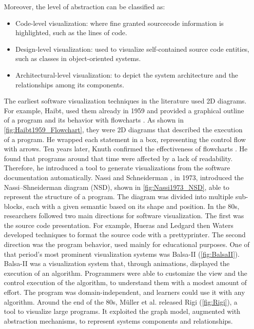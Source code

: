 Moreover, the level of abstraction can be classified as:
\begin{itemize}
	\item Code-level visualization: where fine granted sourcecode information is highlighted, such as the lines of code. 
	\item Design-level visualization: used to visualize self-contained source code entities, such as classes in object-oriented systems. 
	\item Architectural-level visualization: to depict the system architecture and the relationships among its components. 
\end{itemize}



The earliest software visualization techniques in the literature used 2D diagrams. 
For example, Haibt, used them already in 1959 and provided a graphical outline of a program and its behavior with flowcharts \cite{Haibt1959}. 
As shown in \autoref{fig:Haibt1959_Flowchart}, they were 2D diagrams that described the execution of a program.
He wrapped each statement in a box, representing the control flow with arrows.
Ten years later, Knuth confirmed the effectiveness of flowcharts \cite{Knuth1963}. 
He found that programs around that time were affected by a lack of readability.
Therefore, he introduced a tool to generate visualizations from the software documentation automatically.
Nassi and Schneiderman \cite{Nassi1973}, in 1973, introduced the Nassi–Shneiderman diagram (NSD), shown in \autoref{fig:Nassi1973_NSD},  able to represent the structure of a program. 
The diagram was divided into multiple sub-blocks, each with a given semantic based on its shape and position. 
In the 80s, researchers followed two main directions for software visualization. The first was the source code presentation.
For example, Hueras and Ledgard \cite{Hueras1977} then Waters \cite{Waters1983} developed techniques to format the source code with a prettyprinter. 
The second direction was the program behavior, used mainly for educational purposes.
One of that period's most prominent visualization systems was Balsa-II \cite{Brown1988} (\autoref{fig:BalsaII}).
Balsa-II was a visualization system that, through animations, displayed the execution of an algorithm.
Programmers were able to customize the view and the control execution of the algorithm, to understand them with a modest amount of effort. 
The program was domain-independent, and learners could use it with any algorithm. 
Around the end of the 80s, Müller et al. \cite{Mueller1988} released Rigi (\autoref{fig:Rigi}), a tool to visualize large programs.
It exploited the graph model, augmented with abstraction mechanisms, to represent systems components and relationships. 


